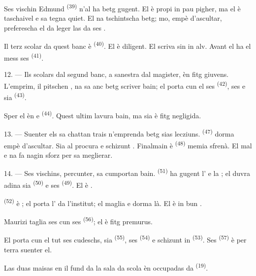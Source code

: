 Ses vischin Edmund \textsuperscript{(39)} n'al ha betg gugent. El è propi in pau
pigher, ma el è taschaivel e sa tegna quiet. El na tschintscha betg; mo, empè
d'ascultar, preferescha el da leger las  da ses .

Il terz scolar da quest banc è  \textsuperscript{(40)}. El è diligent.
El scriva sin in  alv. Avant el ha el mess ses
 \textsuperscript{(41)}.

12. --- Ils scolars dal segund banc, a sanestra dal magister, èn fitg giuvens.
L'emprim, il pitschen , na sa anc betg scriver bain; el porta cun el
ses  \textsuperscript{(42)}, ses  e sia
 \textsuperscript{(43)}.

Sper el èn  e  \textsuperscript{(44)}. Quest ultim
lavura bain, ma sia  è fitg negligida.

13. --- Suenter els sa chattan trais  n'emprenda betg sias
lecziuns.  \textsuperscript{(47)} dorma empè d'ascultar. Sia
 al procura  e schizunt .
Finalmain è  \textsuperscript{(48)} memia sfrenà. El
 mal e na fa nagin sforz per sa meglierar.

14. --- Ses vischins, percunter, sa cumportan bain. 
\textsuperscript{(51)} ha gugent l' e la ; el
duvra adina sia  \textsuperscript{(50)} e ses 
\textsuperscript{(49)}. El è .

 \textsuperscript{(52)} è ; el porta
l' da l'institut; el maglia e dorma là. El è in bun
.

Maurizi taglia ses  cun ses 
\textsuperscript{(56)}; el è fitg premurus.

El porta cun el tut ses cudeschs, sia  \textsuperscript{(55)},
ses  \textsuperscript{(54)} e schizunt in
 \textsuperscript{(53)}. Ses 
\textsuperscript{(57)} è per terra suenter el.

Las duas maisas en il fund da la sala da scola èn occupadas da  \textsuperscript{(19)}.

